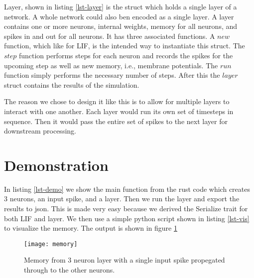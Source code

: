 \documentclass[12pt,english]{article}
\begin{document}

Layer, shown in listing \ref{lst-layer} is the struct which holds a single layer of a network.
A whole network could also ben encoded as a single layer. 
A layer contains one or more neurons, internal weights, memory for all neurons, and spikes in and out for all neurons.
It has three associated functions.
A $new$ function, which like for LIF, is the intended way to instantiate this struct.
The $step$ function performs steps for each neuron and records the spikes for the upcoming step as well as new memory, i.e., membrane potentials.
The $run$ function simply performs the necessary number of steps.
After this the $layer$ struct contains the results of the simulation.

The reason we chose to design it like this is to allow for multiple layers to interact with one another.
Each layer would run its own set of timesteps in sequence.
Then it would pass the entire set of spikes to the next layer for downstream processing.


\section{Demonstration}

In listing \ref{lst-demo} we show the main function from the rust code which creates 3 neurons, an input spike, and a layer.
Then we run the layer and export the results to json.
This is made very easy because we derived the Serialize trait for both LIF and layer.
We then use a simple python script shown in listing \ref{lst-vis} to visualize the memory.
The output is shown in figure \ref{fig-mem}



\begin{figure}[h]
    \centering
    \texttt{[image: memory]}
    \caption{Memory from 3 neuron layer with a single input spike propegated through to the other neurons.}
    \label{fig-mem}
\end{figure}





\lstlistoflistings
\end{document}
